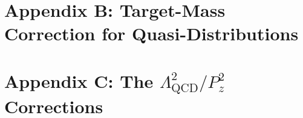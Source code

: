\documentclass[prd,aps,nofootinbib,superscriptaddress,showpacs,floatfix,preprintnumbers]{revtex4}
\begin{document}
\section*{Appendix B: Target-Mass Correction for Quasi-Distributions}
\label{sec:tmc_appendix}


\section*{Appendix C: The $\Lambda_\text{QCD}^2/P_z^2$ Corrections}
\label{sec:appendix}


\ifx\@bibitemShut\undefined\let\@bibitemShut\relax\fi
\makeatother
%

\end{document}
